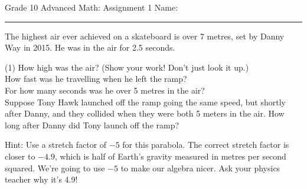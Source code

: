 \documentclass[fleqn,12pt]{article}
\begin{document}
\pagestyle{empty}
\noindent Grade 10 Advanced Math: Assignment 1 \hfill Name: \hspace{2in}
\medskip\hrule
\vspace{1em}
\noindent
The highest air ever achieved on a skateboard is over 7 metres, set by Danny Way in 2015.  He was in the air for 2.5 seconds.
\begin{tasks}(1)
\task How high was the air?  (Show your work!  Don't just look it up.)
\\[4in]
\task How fast was he travelling when he left the ramp?
\\[4in]
\task For how many seconds was he over 5 metres in the air?
\\[4in]
\task Suppose Tony Hawk launched off the ramp going the same speed, but shortly after Danny, and they collided when they were both 5 meters in the air.  How long after Danny did Tony launch off the ramp?
\\[4in]
\end{tasks}
Hint: Use a stretch factor of $-5$ for this parabola.  The correct stretch factor is closer to $-4.9$, which is half of Earth’s gravity measured in metres per second squared.  We're going to use $-5$ to make our algebra nicer. Ask your physics teacher why it's 4.9!
\end{document}
